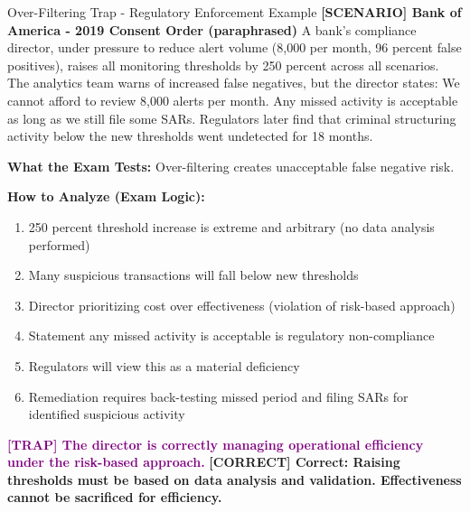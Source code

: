 \documentclass[11pt,a4paper]{beamer}
\newcommand{\trap}[1]{\textcolor{purple}{\textbf{[TRAP] #1}}}
\newcommand{\correct}[1]{\textcolor{green!50!black}{\textbf{[CORRECT] #1}}}
\newcommand{\scenario}[1]{\textcolor{blue!70!black}{\textbf{[SCENARIO] #1}}}
\begin{document}
	\begin{frame}{Over-Filtering Trap - Regulatory Enforcement Example}
		\scenario{Bank of America - 2019 Consent Order (paraphrased)}
		A bank's compliance director, under pressure to reduce alert volume (8,000 per month, 96 percent false positives), raises all monitoring thresholds by 250 percent across all scenarios. The analytics team warns of increased false negatives, but the director states: We cannot afford to review 8,000 alerts per month. Any missed activity is acceptable as long as we still file some SARs. Regulators later find that criminal structuring activity below the new thresholds went undetected for 18 months.
		
		\textbf{What the Exam Tests:} Over-filtering creates unacceptable false negative risk.
		
		\textbf{How to Analyze (Exam Logic):}
		\begin{enumerate}
			\item 250 percent threshold increase is extreme and arbitrary (no data analysis performed)
			\item Many suspicious transactions will fall below new thresholds
			\item Director prioritizing cost over effectiveness (violation of risk-based approach)
			\item Statement any missed activity is acceptable is regulatory non-compliance
			\item Regulators will view this as a material deficiency
			\item Remediation requires back-testing missed period and filing SARs for identified suspicious activity
		\end{enumerate}
		
		\trap{The director is correctly managing operational efficiency under the risk-based approach.}
		\correct{Correct: Raising thresholds must be based on data analysis and validation. Effectiveness cannot be sacrificed for efficiency.}
	\end{frame}
	
\end{document}
